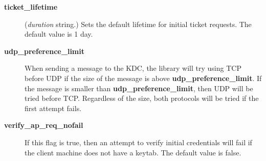 \documentclass[letterpaper,10pt,english]{sphinxmanual}
\begin{document}
\begin{description}
\item[{\textbf{ticket\_lifetime}}] \leavevmode
(\emph{duration} string.)  Sets the default lifetime for initial
ticket requests.  The default value is 1 day.

\item[{\textbf{udp\_preference\_limit}}] \leavevmode
When sending a message to the KDC, the library will try using TCP
before UDP if the size of the message is above
\textbf{udp\_preference\_limit}.  If the message is smaller than
\textbf{udp\_preference\_limit}, then UDP will be tried before TCP.
Regardless of the size, both protocols will be tried if the first
attempt fails.

\item[{\textbf{verify\_ap\_req\_nofail}}] \leavevmode
If this flag is true, then an attempt to verify initial
credentials will fail if the client machine does not have a
keytab.  The default value is false.

\end{description}
\end{document}
